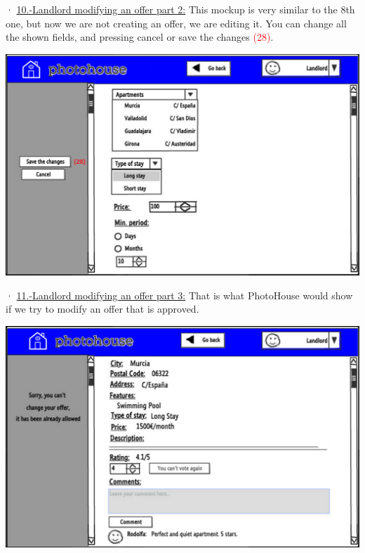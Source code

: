 \documentclass[12pt]{article}
\begin{document}
{· \underline{10.-Landlord modifying an offer part 2:} This mockup is very similar to the 8th one, but now we are not creating an offer, we are editing it. You can change all the shown fields, and pressing cancel or save the changes \textcolor{red}{(28)}.
\begin{center}
	\includegraphics[scale=.7]{landlord_editing_allowed.PNG}
\end{center}


· \underline{11.-Landlord modifying an offer part 3:} That is what PhotoHouse would show if we try to modify an offer that is approved.
\begin{center}
	\includegraphics[scale=.7]{landlord_editing_denied.PNG}
\end{center}


}
\end{document}
